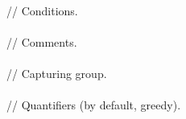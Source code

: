 \begin{bigbigpre}
 \\
// Conditions. \\
 \\
// Comments. \\
 \\
// Capturing group. \\
 \\
// Quantifiers (by default, greedy). \\

\end{bigbigpre}
